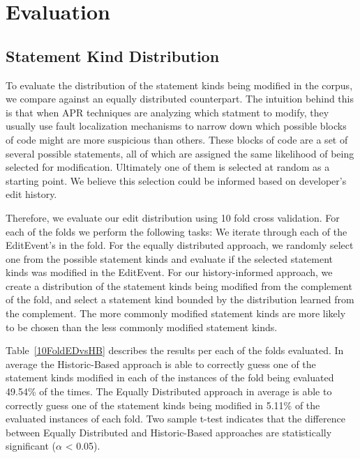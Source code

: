 \documentclass[sigconf]{acmart}
\begin{document}
\section{Evaluation}
\label{eval}

\subsection{Statement Kind Distribution}
To evaluate the distribution of the statement kinds being modified
in the corpus, we compare against an equally distributed counterpart.
The intuition behind this is that when APR techniques are analyzing 
which statment to modify, they usually use fault localization 
mechanisms to narrow down which possible blocks of code might are
more suspicious than others. These blocks of code are 
a set of several possible statements, all of which are assigned
the same likelihood of being selected for modification.
Ultimately one of them is selected at random as a starting point.
We believe this selection could be informed based on developer's
edit history.

Therefore, we evaluate our edit distribution using 10 fold
cross validation. For each of the folds we perform the following
tasks:
We iterate through each of the EditEvent's in the fold. For
the equally distributed approach, we randomly select one from 
the possible statement kinds and evaluate if the selected
statement kinds was modified in the EditEvent.
For our history-informed approach, we create a distribution
of the statement kinds being modified from the complement of the fold, 
and select a statement
kind bounded by the distribution 
learned from the complement. The more commonly modified statement
kinds are more likely to be chosen than the less commonly modified
statement kinds.

Table~\ref{10FoldEDvsHB} describes the results per each of the folds evaluated.
In average 
the Historic-Based approach is able to correctly guess one of  the statement kinds modified
in each of the instances of the fold being evaluated 49.54\% of the times. The Equally Distributed approach
in average is able to correctly guess one of the statement kinds being modified in 5.11\% 
of the evaluated instances of each fold.
Two sample t-test indicates that the difference between Equally Distributed and Historic-Based approaches are statistically significant ($\alpha$ < 0.05).
\end{document}
